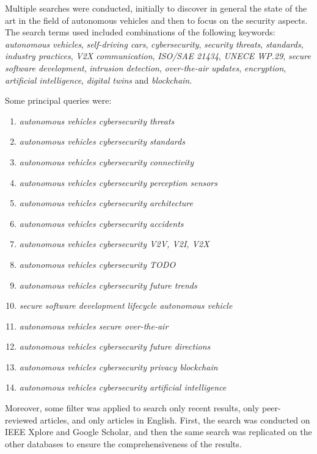 Multiple searches were conducted, initially to discover in general the state of the art in the field of autonomous vehicles and then to focus on the security aspects.
The search terms used included combinations of the following keywords:
\textit{autonomous vehicles}, \textit{self-driving cars}, \textit{cybersecurity}, \textit{security threats}, \textit{standards}, \textit{industry practices}, \textit{V2X communication}, \textit{ISO/SAE 21434}, \textit{UNECE WP.29}, \textit{secure software development}, \textit{intrusion detection}, \textit{over-the-air updates}, \textit{encryption}, \textit{artificial intelligence}, \textit{digital twins} and \textit{blockchain}.

Some principal queries were:
\begin{enumerate}
    \item \textit{autonomous vehicles cybersecurity threats}
    \item \textit{autonomous vehicles cybersecurity standards}
    \item \textit{autonomous vehicles cybersecurity connectivity}
    \item \textit{autonomous vehicles cybersecurity perception sensors}
    \item \textit{autonomous vehicles cybersecurity architecture}
    \item \textit{autonomous vehicles cybersecurity accidents}
    \item \textit{autonomous vehicles cybersecurity V2V, V2I, V2X}
    \item \textit{autonomous vehicles cybersecurity TODO}
    \item \textit{autonomous vehicles cybersecurity future trends}
    \item \textit{secure software development lifecycle autonomous vehicle}
    \item \textit{autonomous vehicles secure over-the-air}
    \item \textit{autonomous vehicles cybersecurity future directions}
    \item \textit{autonomous vehicles cybersecurity privacy blockchain}
    \item \textit{autonomous vehicles cybersecurity artificial intelligence}
\end{enumerate}

Moreover, some filter was applied to search only recent results, only peer-reviewed articles, and only articles in English.
First, the search was conducted on IEEE Xplore and Google Scholar, and then the same search was replicated on the other databases to ensure the comprehensiveness of the results.

